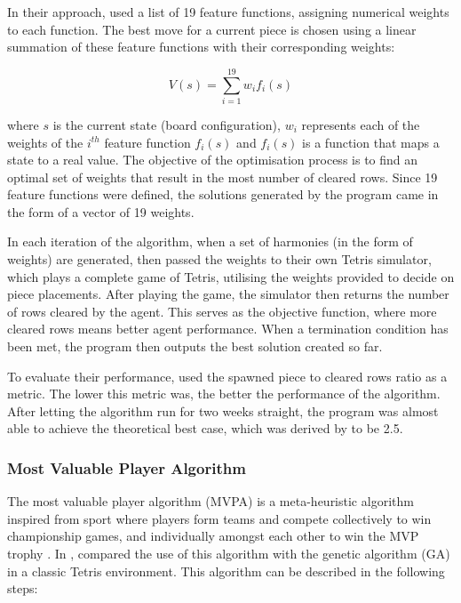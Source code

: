 \documentclass[a4paper, 12pt]{extreport}
\begin{document}
	In their approach, \citeauthor{tetris-harmony-search} \cite{tetris-harmony-search} used a list of 19 feature functions, assigning numerical weights to each function. The best move for a current piece is chosen using a linear summation of these feature functions with their corresponding weights:
	
	\begin{equation}
		V(s) = \sum_{i=1}^{19}w_{i}f_{i}(s)
	\end{equation}
	
	\noindent where $s$ is the current state (board configuration), $w_i$ represents each of the weights of the $i^{th}$ feature function $f_i(s)$ and $f_i(s)$ is a function that maps a state to a real value. The objective of the optimisation process is to find an optimal set of weights that result in the most number of cleared rows. Since 19 feature functions were defined, the solutions generated by the program came in the form of a vector of 19 weights.
	
	In each iteration of the algorithm, when a set of harmonies (in the form of weights) are generated, \citeauthor{tetris-harmony-search} \cite{tetris-harmony-search} then passed the weights to their own Tetris simulator, which plays a complete game of Tetris, utilising the weights provided to decide on piece placements. After playing the game, the simulator then returns the number of rows cleared by the agent. This serves as the objective function, where more cleared rows means better agent performance. When a termination condition has been met, the program then outputs the best solution created so far.
	
	To evaluate their performance, \citeauthor{tetris-harmony-search} \cite{tetris-harmony-search} used the spawned piece to cleared rows ratio as a metric. The lower this metric was, the better the performance of the algorithm. After letting the algorithm run for two weeks straight, the program was almost able to achieve the theoretical best case, which was derived by \citeauthor{fahey-ai} \cite{fahey-ai} to be 2.5.
	
	\subsubsection{Most Valuable Player Algorithm}
	
	The most valuable player algorithm (MVPA) is a meta-heuristic algorithm inspired from sport where players form teams and compete collectively to win championship games, and individually amongst each other to win the MVP trophy \cite{mvpa}. In \citeyear{tetris-mvpa-ga}, \citeauthor{tetris-mvpa-ga} \cite{tetris-mvpa-ga} compared the use of this algorithm with the genetic algorithm (GA) in a classic Tetris environment. This algorithm can be described in the following steps:
	
\end{document}
